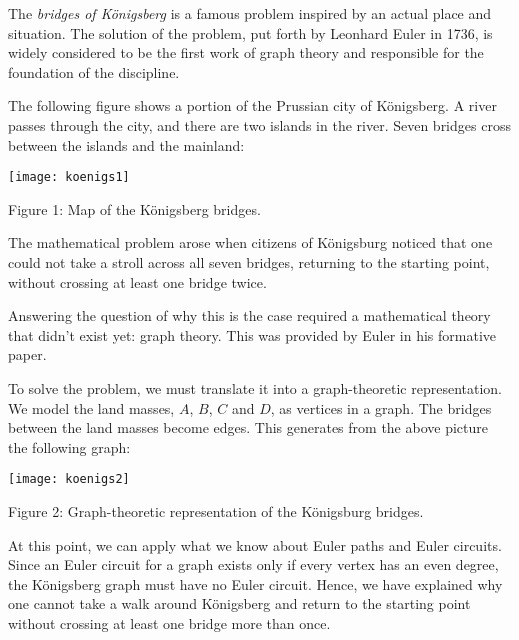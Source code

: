 \documentclass[12pt]{article}
\begin{document}
The \emph{bridges of K\"onigsberg} is a famous problem inspired by an actual place and situation.  The solution of the problem, put forth by Leonhard Euler in 1736, is widely considered to be the first work of graph theory and responsible for the foundation of the discipline.

The following figure shows a portion of the Prussian city of K\"onigsberg.  A river passes through the city, and there are two islands in the river.  Seven bridges cross between the islands and the mainland:

\begin{center}
\texttt{[image: koenigs1]}

{\tiny Figure 1: Map of the K\"onigsberg bridges.}
\end{center}

The mathematical problem arose when citizens of K\"onigsburg noticed that one could not take a stroll across all seven bridges, returning to the starting point, without crossing at least one bridge twice.  

Answering the question of why this is the case required a mathematical theory that didn't exist yet: graph theory.  This was provided by Euler in his formative paper.

To solve the problem, we must translate it into a graph-theoretic representation.  We model the land masses, $A$, $B$, $C$ and $D$, as vertices in a graph.  The bridges between the land masses become edges.  This generates from the above picture the following graph:

\begin{center}
\texttt{[image: koenigs2]}

{\tiny Figure 2: Graph-theoretic representation of the K\"onigsburg bridges.}
\end{center}

At this point, we can apply what we know about Euler paths and Euler circuits.    Since an Euler circuit for a graph exists only if every vertex has an even degree, the K\"onigsberg graph must have no Euler circuit.  Hence, we have explained why one cannot take a walk around K\"onigsberg and return to the starting point without crossing at least one bridge more than once.
\end{document}
